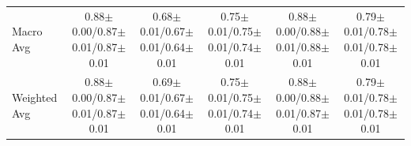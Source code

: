 \begin{table}[!t]
{\begin{tabular}{l|cccc|cccc|cccc|cccc|cccc}
Macro Avg & \multicolumn{4}{c|}{0.88$\pm$0.00/0.87$\pm$0.01/0.87$\pm$0.01} & \multicolumn{4}{c|}{0.68$\pm$0.01/0.67$\pm$0.01/0.64$\pm$0.01} & \multicolumn{4}{c|}{0.75$\pm$0.01/0.75$\pm$0.01/0.74$\pm$0.01} & \multicolumn{4}{c|}{0.88$\pm$0.00/0.88$\pm$0.01/0.88$\pm$0.01} & \multicolumn{4}{c}{0.79$\pm$0.01/0.78$\pm$0.01/0.78$\pm$0.01} \\
Weighted Avg & \multicolumn{4}{c|}{0.88$\pm$0.00/0.87$\pm$0.01/0.87$\pm$0.01} & \multicolumn{4}{c|}{0.69$\pm$0.01/0.67$\pm$0.01/0.64$\pm$0.01} & \multicolumn{4}{c|}{0.75$\pm$0.01/0.75$\pm$0.01/0.74$\pm$0.01} & \multicolumn{4}{c|}{0.88$\pm$0.00/0.88$\pm$0.01/0.87$\pm$0.01} & \multicolumn{4}{c}{0.79$\pm$0.01/0.78$\pm$0.01/0.78$\pm$0.01} \\
\bottomrule
\end{tabular}}
\end{table}

